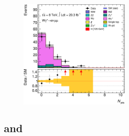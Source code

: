 \begin{figure}[p]
	\hfill
	\includegraphics[width=0.495\textwidth]{tex/backgrounds/Wgstar/em_CutDPhiMax_m_jet_n_mh125_lin}
	\caption{}
	\label{fig:wgstar:vr}
\end{figure}


\subsection{\ZZ and \Zgstar}
\label{sec:diboson:zz}


